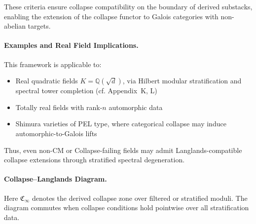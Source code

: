 \documentclass[11pt]{article}
\begin{document}
These criteria ensure collapse compatibility on the boundary of derived substacks, enabling the extension of the collapse functor to Galois categories with non-abelian targets.

\medskip

\paragraph{Examples and Real Field Implications.}

This framework is applicable to:
\begin{itemize}
  \item Real quadratic fields \( K = \mathbb{Q}(\sqrt{d}) \), via Hilbert modular stratification and spectral tower completion (cf. Appendix~K, L)
  \item Totally real fields with rank-\( n \) automorphic data
  \item Shimura varieties of PEL type, where categorical collapse may induce automorphic-to-Galois lifts
\end{itemize}

Thus, even non-CM or Collapse-failing fields may admit Langlands-compatible collapse extensions through stratified spectral degeneration.

\medskip

\paragraph{Collapse–Langlands Diagram.}

\begin{center}
\end{center}

Here \( \mathfrak{C}_\infty \) denotes the derived collapse zone over filtered or stratified moduli.  
The diagram commutes when collapse conditions hold pointwise over all stratification data.

\medskip
\end{document}
